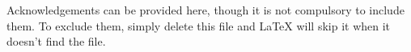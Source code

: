 Acknowledgements can be provided here, though it is not compulsory to include them. To exclude them, simply delete this file and \LaTeX{} will skip it when it doesn't find the file.